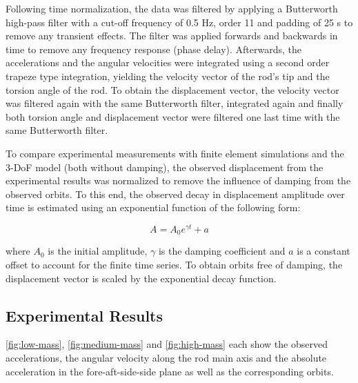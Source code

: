 \documentclass{article}
\begin{document}
Following time normalization, the data was filtered by applying a Butterworth high-pass filter with a cut-off frequency of 0.5 Hz, order 11 and padding of 25 s to remove any transient effects. The filter was applied forwards and backwards in time to remove any frequency response (phase delay). Afterwards, the accelerations and the angular velocities were integrated using a second order trapeze type integration, yielding the velocity vector of the rod's tip and the torsion angle of the rod. To obtain the displacement vector, the velocity vector was filtered again with the same Butterworth filter, integrated again and finally both torsion angle and displacement vector were filtered one last time with the same Butterworth filter.

To compare experimental measurements with finite element simulations and the 3-DoF model (both without damping), the observed displacement from the experimental results was normalized to remove the influence of damping from the observed orbits. To this end, the observed decay in displacement amplitude over time is estimated using an exponential function of the following form:

\begin{equation}
    A = A_0 e ^ {\gamma t} + a
\end{equation}

where $A_0$ is the initial amplitude, $\gamma$ is the damping coefficient and $a$ is a constant offset to account for the finite time series. To obtain orbits free of damping, the displacement vector is scaled by the exponential decay function. 

\subsection{Experimental Results}

\autoref{fig:low-mass}, \autoref{fig:medium-mass} and \autoref{fig:high-mass} each show the observed accelerations, the angular velocity along the rod main axis and the absolute acceleration in the fore-aft-side-side plane as well as the corresponding orbits.

\end{document}
